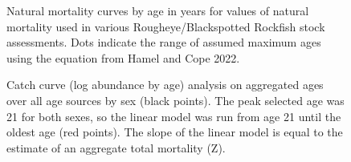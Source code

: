 \documentclass[
]{scrartcl}
\begin{document}
\begin{figure}[H]


\caption{\label{fig-Mcurves}Natural mortality curves by age in years for
values of natural mortality used in various Rougheye/Blackspotted
Rockfish stock assessments. Dots indicate the range of assumed maximum
ages using the equation from Hamel and Cope 2022.}

\end{figure}%

\begin{figure}[H]


\caption{\label{fig-CC_Z}Catch curve (log abundance by age) analysis on
aggregated ages over all age sources by sex (black points). The peak
selected age was 21 for both sexes, so the linear model was run from age
21 until the oldest age (red points). The slope of the linear model is
equal to the estimate of an aggregate total mortality (Z).}

\end{figure}%
\end{document}
